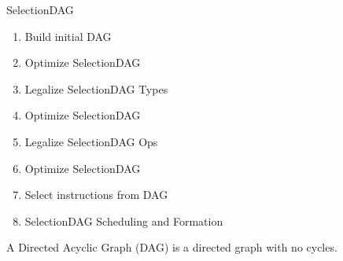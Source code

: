 \begin{frame}{SelectionDAG}
    \begin{enumerate}
    \item 
    Build initial DAG
    \item
    Optimize SelectionDAG
    \item
    Legalize SelectionDAG Types 
    \item
    Optimize SelectionDAG 
    \item
    Legalize SelectionDAG Ops 
    \item
    Optimize SelectionDAG
    \item
    Select instructions from DAG
    \item
    SelectionDAG Scheduling and Formation
    \end{enumerate}

	\begin{definition}
		A \alert{Directed Acyclic Graph (DAG)} is a directed graph with no cycles.
	\end{definition}
\end{frame}
